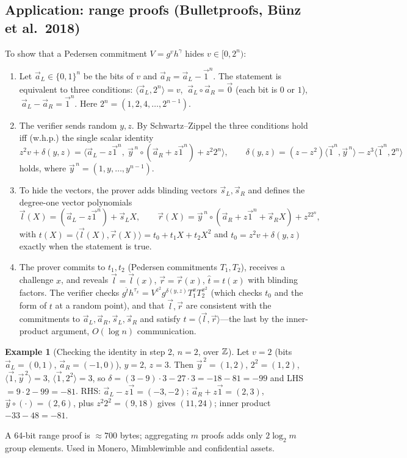 \documentclass[11pt,a4paper]{report}
\theoremstyle{plain}
\theoremstyle{definition}
\newtheorem{example}[theorem]{Example}
\theoremstyle{remark}
\begin{document}
\subsection{Application: range proofs (Bulletproofs, B\"unz et al.\ 2018)}
To show that a Pedersen commitment $V=g^vh^\gamma$ hides $v\in[0,2^n)$:
\begin{enumerate}
\item Let $\vec a_L\in\{0,1\}^n$ be the bits of $v$ and $\vec a_R=\vec a_L-\vec1^n$. The statement is equivalent to three conditions: $\langle\vec a_L,2^n\rangle=v$, $\ \vec a_L\circ\vec a_R=\vec0$ (each bit is $0$ or $1$), $\ \vec a_L-\vec a_R=\vec1^n$. Here $2^n=(1,2,4,\dots,2^{n-1})$.
\item The verifier sends random $y,z$. By Schwartz--Zippel the three conditions hold iff (w.h.p.) the single scalar identity
\[z^2v+\delta(y,z)=\big\langle\vec a_L-z\vec1^n,\ \vec y^{\,n}\circ(\vec a_R+z\vec1^n)+z^2 2^n\big\rangle,\qquad\delta(y,z)=(z-z^2)\langle\vec1^n,\vec y^{\,n}\rangle-z^3\langle\vec1^n,2^n\rangle\]
holds, where $\vec y^{\,n}=(1,y,\dots,y^{n-1})$.
\item To hide the vectors, the prover adds blinding vectors $\vec s_L,\vec s_R$ and defines the degree-one vector polynomials
\[\vec l(X)=(\vec a_L-z\vec1^n)+\vec s_LX,\qquad \vec r(X)=\vec y^{\,n}\circ(\vec a_R+z\vec1^n+\vec s_RX)+z^22^n,\]
with $t(X)=\langle\vec l(X),\vec r(X)\rangle=t_0+t_1X+t_2X^2$ and $t_0=z^2v+\delta(y,z)$ exactly when the statement is true.
\item The prover commits to $t_1,t_2$ (Pedersen commitments $T_1,T_2$), receives a challenge $x$, and reveals $\vec l=\vec l(x)$, $\vec r=\vec r(x)$, $\hat t=t(x)$ with blinding factors. The verifier checks $g^{\hat t}h^{\tau_x}=V^{z^2}g^{\delta(y,z)}T_1^xT_2^{x^2}$ (which checks $t_0$ and the form of $t$ at a random point), and that $\vec l,\vec r$ are consistent with the commitments to $\vec a_L,\vec a_R,\vec s_L,\vec s_R$ and satisfy $\hat t=\langle\vec l,\vec r\rangle$---the last by the inner-product argument, $O(\log n)$ communication.
\end{enumerate}
\begin{example}[Checking the identity in step 2, $n=2$, over $\mathbb{Z}$]
Let $v=2$ (bits $\vec a_L=(0,1)$, $\vec a_R=(-1,0)$), $y=2$, $z=3$. Then $\vec y^{\,2}=(1,2)$, $2^2=(1,2)$, $\langle\vec1,\vec y^{\,2}\rangle=3$, $\langle\vec1,2^2\rangle=3$, so $\delta=(3-9)\cdot3-27\cdot3=-18-81=-99$ and LHS $=9\cdot2-99=-81$. RHS: $\vec a_L-z\vec1=(-3,-2)$; $\vec a_R+z\vec1=(2,3)$, $\vec y\circ(\cdot)=(2,6)$, plus $z^2 2^2=(9,18)$ gives $(11,24)$; inner product $-33-48=-81$. \checkmark
\end{example}
A 64-bit range proof is $\approx700$ bytes; aggregating $m$ proofs adds only $2\log_2m$ group elements. Used in Monero, Mimblewimble and confidential assets.
\end{document}
